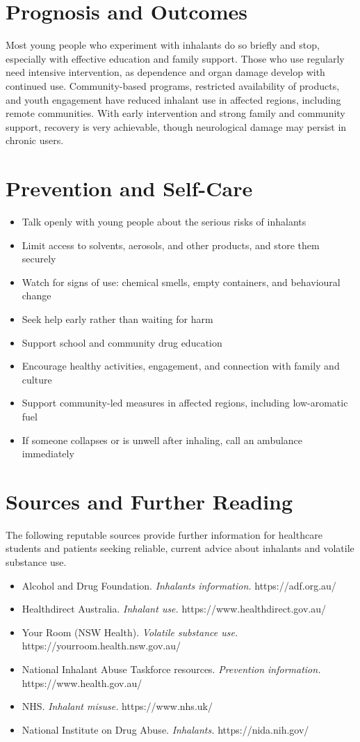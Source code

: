 \section*{Prognosis and Outcomes}
Most young people who experiment with inhalants do so briefly and stop, especially with effective education and family support. Those who use regularly need intensive intervention, as dependence and organ damage develop with continued use. Community-based programs, restricted availability of products, and youth engagement have reduced inhalant use in affected regions, including remote communities. With early intervention and strong family and community support, recovery is very achievable, though neurological damage may persist in chronic users.

\section*{Prevention and Self-Care}
\begin{itemize}
    \item Talk openly with young people about the serious risks of inhalants
    \item Limit access to solvents, aerosols, and other products, and store them securely
    \item Watch for signs of use: chemical smells, empty containers, and behavioural change
    \item Seek help early rather than waiting for harm
    \item Support school and community drug education
    \item Encourage healthy activities, engagement, and connection with family and culture
    \item Support community-led measures in affected regions, including low-aromatic fuel
    \item If someone collapses or is unwell after inhaling, call an ambulance immediately
\end{itemize}

\section*{Sources and Further Reading}
The following reputable sources provide further information for healthcare students and patients seeking reliable, current advice about inhalants and volatile substance use.
\begin{itemize}
    \item Alcohol and Drug Foundation. \textit{Inhalants information.} https://adf.org.au/
    \item Healthdirect Australia. \textit{Inhalant use.} https://www.healthdirect.gov.au/
    \item Your Room (NSW Health). \textit{Volatile substance use.} https://yourroom.health.nsw.gov.au/
    \item National Inhalant Abuse Taskforce resources. \textit{Prevention information.} https://www.health.gov.au/
    \item NHS. \textit{Inhalant misuse.} https://www.nhs.uk/
    \item National Institute on Drug Abuse. \textit{Inhalants.} https://nida.nih.gov/
\end{itemize}
